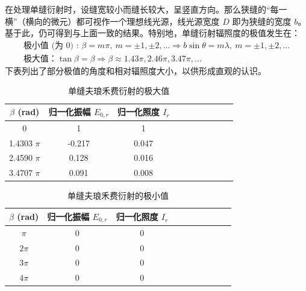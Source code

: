 \documentclass[UTF8]{report}
\theoremstyle{MyLineTheoremStyle} %
\theoremstyle{MyBlockTheoremStyle} %
\theoremstyle{MySubsubsectionStyle} %
\begin{document}
在处理单缝衍射时，设缝宽较小而缝长较大，呈竖直方向。那么狭缝的“每一横”（横向的微元）都可视作一个理想线光源，线光源宽度 $D$ 即为狭缝的宽度 $b$。基于此，仍可得到与上面一致的结果。特别地，单缝衍射辐照度的极值发生在：
\begin{gather}
\text{极小值 (为 0) : \ } \beta = m \pi,\ m = \pm 1, \pm 2, ... \Longrightarrow b \sin \theta = m \lambda,\ m = \pm 1, \pm 2, ... \\ 
\text{极大值：} \tan \beta = \beta \Longrightarrow \beta \approx 1.43 \pi, 2.46 \pi, 3.47 \pi, ...
\end{gather}
下表列出了部分极值的角度和相对辐照度大小，以供形成直观的认识。
\vspace*{-5mm}\begin{center}
\noindent\begin{minipage}{0.49\columnwidth}
    \begin{table}[H]\centering
        \caption{单缝夫琅禾费衍射的极大值}
        \label{单缝夫琅禾费衍射的极大值}
    \begin{tabular}{cccccccccc}\toprule
        $\beta$ (rad) & 归一化振幅 $E_{0, r}$ & 归一化照度 $I_r$ \\
        \midrule
        0            & 1      & 1      \\
        1.4303 $\pi$ & -0.217 & 0.047  \\
        2.4590 $\pi$ & 0.128  & 0.016  \\
        3.4707 $\pi$ & 0.091  & 0.008  \\
        \bottomrule
    \end{tabular}
    \end{table}
\end{minipage}\hfill\begin{minipage}{0.49\columnwidth}
    \begin{table}[H]\centering
        \caption{单缝夫琅禾费衍射的极小值}
        \label{单缝夫琅禾费衍射的极小值}
    \begin{tabular}{cccccccccc}\toprule
        $\beta$ (rad) & 归一化振幅 $E_{0, r}$ & 归一化照度 $I_r$ \\
        \midrule
        $\pi$  & 0 & 0 \\
        $2\pi$ & 0 & 0 \\
        $3\pi$ & 0 & 0 \\
        $4\pi$ & 0 & 0 \\
        \bottomrule
    \end{tabular}
    \end{table}
\end{minipage}\end{center}
\end{document}

